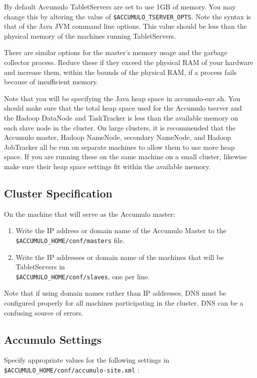 By default Accumulo TabletServers are set to use 1GB of memory. You may change
this by altering the value of \texttt{\$ACCUMULO\_TSERVER\_OPTS}. Note the syntax is that of
the Java JVM command line options. This value should be less than the physical
memory of the machines running TabletServers.

There are similar options for the master's memory usage and the garbage collector
process. Reduce these if they exceed the physical RAM of your hardware and
increase them, within the bounds of the physical RAM, if a process fails because of
insufficient memory.

Note that you will be specifying the Java heap space in accumulo-env.sh. You should
make sure that the total heap space used for the Accumulo tserver and the Hadoop
DataNode and TaskTracker is less than the available memory on each slave node in
the cluster. On large clusters, it is recommended that the Accumulo master, Hadoop
NameNode, secondary NameNode, and Hadoop JobTracker all be run on separate
machines to allow them to use more heap space. If you are running these on the
same machine on a small cluster, likewise make sure their heap space settings fit
within the available memory.

\subsection{Cluster Specification}

On the machine that will serve as the Accumulo master:

\begin{enumerate}
\item{Write the IP address or domain name of the Accumulo Master to the\\\texttt{\$ACCUMULO\_HOME/conf/masters} file.}
\item{Write the IP addresses or domain name of the machines that will be TabletServers in\\\texttt{\$ACCUMULO\_HOME/conf/slaves}, one per line.}
\end{enumerate}

Note that if using domain names rather than IP addresses, DNS must be configured
properly for all machines participating in the cluster. DNS can be a confusing source
of errors.

\subsection{Accumulo Settings}
Specify appropriate values for the following settings in\\
\texttt{\$ACCUMULO\_HOME/conf/accumulo-site.xml} :

